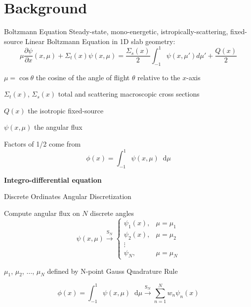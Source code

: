 \documentclass[10pt]{beamer}
\newcommand{\ud}{\mathop{}\!\mathrm{d}} %
\newcommand{\pderiv}[2]{\frac{\partial #1}{\partial #2}}
\begin{document}
\section{Background}

\begin{frame}{Boltzmann Equation}
    Steady-state, mono-energetic, istropically-scattering, fixed-source Linear Boltzmann Equation in 1D slab geometry:
    \begin{equation*}
        \mu \pderiv{\psi}{x}(x, \mu) + \Sigma_t(x) \psi(x,\mu) = 
        \frac{\Sigma_s(x)}{2} \int_{-1}^{1} \psi(x, \mu') d\mu' + \frac{Q(x)}{2}
    \end{equation*}

    $\mu = \cos \theta$ the cosine of the angle of flight $\theta$ relative to the $x$-axis

    $\Sigma_t(x)$, $\Sigma_s(x)$ total and scattering macroscopic cross sections 

    $Q(x)$ the isotropic fixed-source

    $\psi(x,\mu)$ the angular flux 

    Factors of 1/2 come from 
        \begin{equation*}
            \phi(x) = \int_{-1}^{1} \psi(x,\mu) \ud \mu
        \end{equation*}

    \textbf{Integro-differential equation}

\end{frame}

\begin{frame}{Discrete Ordinates Angular Discretization}

    Compute angular flux on $N$ discrete angles 
        \begin{equation*}
            \psi(x,\mu) \xrightarrow{\text{S}_N} 
            \begin{cases}
                \psi_1(x), & \mu = \mu_1 \\ 
                \psi_2(x), & \mu = \mu_2 \\ 
                \vdots \\ 
                \psi_N, & \mu = \mu_N 
            \end{cases}
        \end{equation*}

    $\mu_1$, $\mu_2$, $\dots$, $\mu_N$ defined by N-point Gauss Quadrature Rule 

    \begin{equation*}
        \phi(x) = \int_{-1}^1 \psi(x, \mu) \ud\mu 
            \xrightarrow{\text{S}_N} \sum_{n=1}^N w_n \psi_n(x)
    \end{equation*}

\end{frame}
\end{document}
